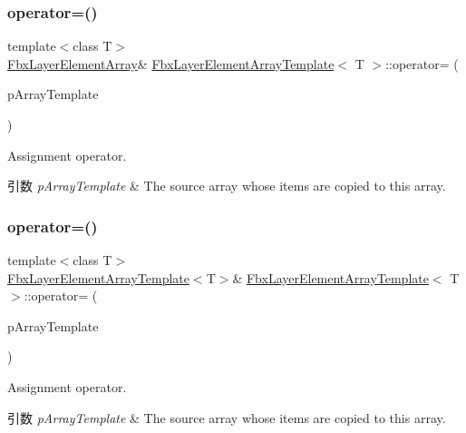 \subsubsection{\texorpdfstring{operator=()}{operator=()}\hspace{0.1cm}{\footnotesize\ttfamily [1/2]}}
{\footnotesize\ttfamily template$<$class T$>$ \\
\hyperlink{class_fbx_layer_element_array}{Fbx\+Layer\+Element\+Array}\& \hyperlink{class_fbx_layer_element_array_template}{Fbx\+Layer\+Element\+Array\+Template}$<$ T $>$\+::operator= (\begin{DoxyParamCaption}\item[{const \hyperlink{class_fbx_array}{Fbx\+Array}$<$ T $>$ \&}]{p\+Array\+Template }\end{DoxyParamCaption})}

Assignment operator. 
\begin{DoxyParams}{引数}
{\em p\+Array\+Template} & The source array whose items are copied to this array. \\
\hline
\end{DoxyParams}
\mbox{\label{class_fbx_layer_element_array_template_a97ad38fd116a2f9ac06d04748e4601b0}} 
\subsubsection{\texorpdfstring{operator=()}{operator=()}\hspace{0.1cm}{\footnotesize\ttfamily [2/2]}}
{\footnotesize\ttfamily template$<$class T$>$ \\
\hyperlink{class_fbx_layer_element_array_template}{Fbx\+Layer\+Element\+Array\+Template}$<$T$>$\& \hyperlink{class_fbx_layer_element_array_template}{Fbx\+Layer\+Element\+Array\+Template}$<$ T $>$\+::operator= (\begin{DoxyParamCaption}\item[{const \hyperlink{class_fbx_layer_element_array_template}{Fbx\+Layer\+Element\+Array\+Template}$<$ T $>$ \&}]{p\+Array\+Template }\end{DoxyParamCaption})}

Assignment operator. 
\begin{DoxyParams}{引数}
{\em p\+Array\+Template} & The source array whose items are copied to this array. \\
\hline
\end{DoxyParams}
\mbox{\label{class_fbx_layer_element_array_template_a1307ade46b3db83ed5cec97e2449f0de}} 
